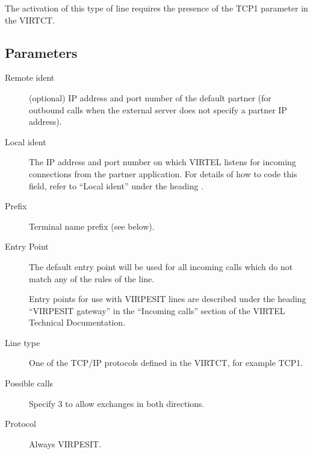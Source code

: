 \documentclass[letterpaper,10pt,english]{sphinxmanual}
\begin{document}
The activation of this type of line requires the presence of the TCP1 parameter in the VIRTCT.


\ignorespaces 

\subsection{Parameters}
\label{\detokenize{connectivity_guide:index-56}}\label{\detokenize{connectivity_guide:id24}}\begin{description}
\item[{Remote ident}] \leavevmode
(optional) IP address and port number of the default partner (for outbound calls when the external server does not specify a partner IP address).

\item[{Local ident}] \leavevmode
The IP address and port number on which VIRTEL listens for incoming connections from the partner application. For details of how to code this field, refer to “Local ident” under the heading {\hyperref[\detokenize{connectivity_guide:bookmark13}]{}}.

\item[{Prefix}] \leavevmode
Terminal name prefix (see below).

\item[{Entry Point}] \leavevmode
The default entry point will be used for all incoming calls which do not match any of the rules of the line.

Entry points for use with VIRPESIT lines are described under the heading “VIRPESIT gateway” in the “Incoming calls” section of the VIRTEL Technical Documentation.

\item[{Line type}] \leavevmode
One of the TCP/IP protocols defined in the VIRTCT, for example TCP1.

\item[{Possible calls}] \leavevmode
Specify 3 to allow exchanges in both directions.

\item[{Protocol}] \leavevmode
Always VIRPESIT.

\end{description}
\end{document}
